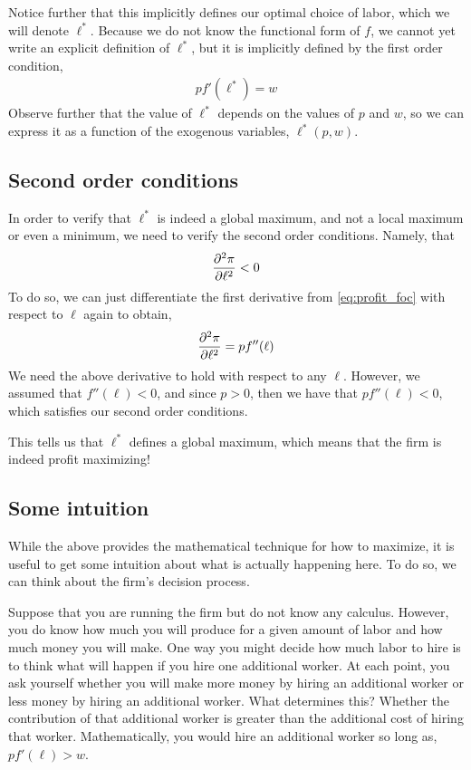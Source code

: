 Notice further that this implicitly defines our optimal choice of labor, which we will denote $\ell^*$. Because we do not know the functional form of $f$, we cannot yet write an explicit definition of $\ell^*$, but it is implicitly defined by the first order condition,
\begin{align}
    p f'(\ell^*) = w \label{eq:general_foc}
\end{align}
Observe further that the value of $\ell^*$ depends on the values of $p$ and $w$, so we can express it as a function of the exogenous variables, $\ell^*(p, w)$. 

\subsection{Second order conditions}
In order to verify that $\ell^*$ is indeed a global maximum, and not a local maximum or even a minimum, we need to verify the second order conditions. Namely, that
\begin{align*}
    \frac{\partial ^2\pi}{\partial \ell^2} < 0
\end{align*}
To do so, we can just differentiate the first derivative from \ref{eq:profit_foc} with respect to $\ell$ again to obtain, 
\begin{align}
    \frac{\partial ^2\pi}{\partial \ell^2} = pf''(\ell) \label{eq:generalized_soc}
\end{align}
We need the above derivative to hold with respect to any $\ell$. However, we assumed that $f''(\ell) < 0$, and since $p > 0$, then we have that $pf''(\ell) < 0$, which satisfies our second order conditions.

This tells us that $\ell^*$ defines a global maximum, which means that the firm is indeed profit maximizing! 

\subsection{Some intuition}
While the above provides the mathematical technique for how to maximize, it is useful to get some intuition about what is actually happening here. To do so, we can think about the firm's decision process.

Suppose that you are running the firm but do not know any calculus. However, you do know how much you will produce for a given amount of labor and how much money you will make. One way you might decide how much labor to hire is to think what will happen if you hire one additional worker. At each point, you ask yourself whether you will make more money by hiring an additional worker or less money by hiring an additional worker. What determines this? Whether the contribution of that additional worker is greater than the additional cost of hiring that worker. Mathematically, you would hire an additional worker so long as, $p f'(\ell) > w$. 

